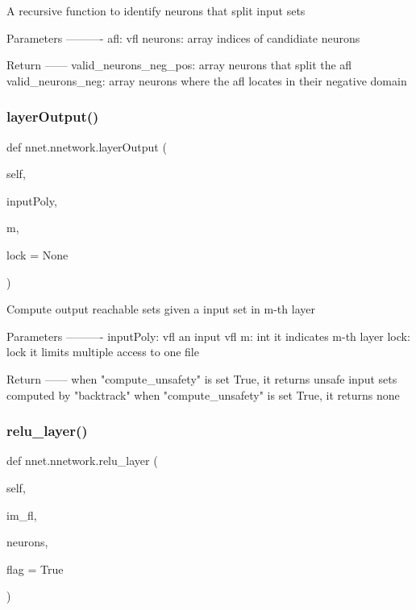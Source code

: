 \begin{DoxyVerb}A recursive function to identify neurons that split input sets

Parameters
----------
afl: vfl
neurons: array
    indices of candidiate neurons

Return
------
valid_neurons_neg_pos: array
    neurons that split the afl
valid_neurons_neg: array
    neurons where the afl locates in their negative domain
\end{DoxyVerb}
 \mbox{\label{classnnet_1_1nnetwork_a3d6fad4cceab8ce0a40a5d06c58b1a86}} 
\subsubsection{\texorpdfstring{layer\+Output()}{layerOutput()}}
{\footnotesize\ttfamily def nnet.\+nnetwork.\+layer\+Output (\begin{DoxyParamCaption}\item[{}]{self,  }\item[{}]{input\+Poly,  }\item[{}]{m,  }\item[{}]{lock = {\ttfamily None} }\end{DoxyParamCaption})}

\begin{DoxyVerb}Compute output reachable sets given a input set in m-th layer

Parameters
----------
inputPoly: vfl
    an input vfl
m: int
    it indicates m-th layer
lock: lock
    it limits multiple access to one file

Return
------
when "compute_unsafety" is set True, it returns unsafe input sets computed by "backtrack"
when "compute_unsafety" is set True, it returns none
\end{DoxyVerb}
 \mbox{\label{classnnet_1_1nnetwork_a29d948dbd33c34bb61d754a98a4422a9}} 
\subsubsection{\texorpdfstring{relu\+\_\+layer()}{relu\_layer()}}
{\footnotesize\ttfamily def nnet.\+nnetwork.\+relu\+\_\+layer (\begin{DoxyParamCaption}\item[{}]{self,  }\item[{}]{im\+\_\+fl,  }\item[{}]{neurons,  }\item[{}]{flag = {\ttfamily True} }\end{DoxyParamCaption})}

